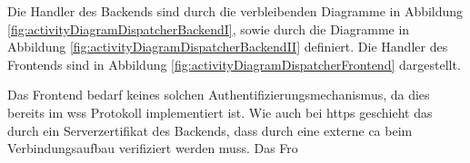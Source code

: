 Die Handler des Backends sind durch die verbleibenden Diagramme in Abbildung \ref{fig:activityDiagramDispatcherBackendI}, 
sowie durch die Diagramme in Abbildung \ref{fig:activityDiagramDispatcherBackendII} definiert.
Die Handler des Frontends sind in Abbildung \ref{fig:activityDiagramDispatcherFrontend} dargestellt.

Das Frontend bedarf keines solchen Authentifizierungsmechanismus, da dies bereits im \ac{wss} Protokoll implementiert ist. 
Wie auch bei \ac{https} geschieht das durch ein Serverzertifikat des Backends, 
dass durch eine externe \ac{ca} beim Verbindungsaufbau verifiziert werden muss.
Das Fro


